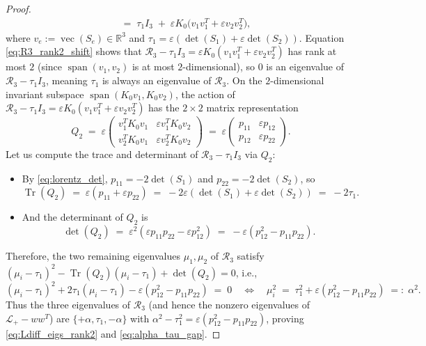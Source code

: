 \documentclass[11pt,a4paper]{article}
\theoremstyle{plain}
\theoremstyle{definition}
\theoremstyle{remark}
\DeclareMathOperator{\Tr}{Tr}
\DeclareMathOperator{\vecop}{vec}
\begin{document}
\begin{proof}
\begin{align}
  &\;=\; \tau_1 I_3 \;+\; \varepsilon K_0 \big(v_1 v_1^T + \varepsilon v_2 v_2^T\big), \label{eq:R3_rank2_shift}
\end{align}
where $v_e := \vecop(S_e) \in \mathbb{R}^3$ and $\tau_1 = \varepsilon(\det(S_1) + \varepsilon \det(S_2))$. Equation \eqref{eq:R3_rank2_shift} shows that $\mathcal{R}_3 - \tau_1 I_3 = \varepsilon K_0(v_1 v_1^T + \varepsilon v_2 v_2^T)$ has rank at most $2$ (since $\operatorname{span}(v_1, v_2)$ is at most $2$-dimensional), so $0$ is an eigenvalue of $\mathcal{R}_3 - \tau_1 I_3$, meaning $\tau_1$ is always an eigenvalue of $\mathcal{R}_3$. On the $2$-dimensional invariant subspace $\operatorname{span}(K_0 v_1, K_0 v_2)$, the action of $\mathcal{R}_3 - \tau_1 I_3 = \varepsilon K_0(v_1 v_1^T + \varepsilon v_2 v_2^T)$ has the $2 \times 2$ matrix representation
\[
  Q_2 \;=\; \varepsilon \begin{pmatrix} v_1^T K_0 v_1 & \varepsilon v_1^T K_0 v_2 \\ v_2^T K_0 v_1 & \varepsilon v_2^T K_0 v_2 \end{pmatrix} \;=\; \varepsilon \begin{pmatrix} p_{11} & \varepsilon p_{12} \\ p_{12} & \varepsilon p_{22} \end{pmatrix}.
\]
Let us compute the trace and determinant of $\mathcal{R}_3 - \tau_1 I_3$ via $Q_2$:
\begin{itemize}[nosep]
  \item By \eqref{eq:lorentz_det}, $p_{11} = -2\det(S_1)$ and $p_{22} = -2\det(S_2)$, so
  \[
    \Tr(Q_2) \;=\; \varepsilon(p_{11} + \varepsilon p_{22}) \;=\; -2\varepsilon(\det(S_1) + \varepsilon \det(S_2)) \;=\; -2\tau_1.
  \]
  \item And the determinant of $Q_2$ is
  \[
    \det(Q_2) \;=\; \varepsilon^2(\varepsilon p_{11}p_{22} - \varepsilon p_{12}^2) \;=\; -\varepsilon(p_{12}^2 - p_{11}p_{22}).
  \]
\end{itemize}
Therefore, the two remaining eigenvalues $\mu_1, \mu_2$ of $\mathcal{R}_3$ satisfy $(\mu_i - \tau_1)^2 - \Tr(Q_2)(\mu_i - \tau_1) + \det(Q_2) = 0$, i.e.,
\[
  (\mu_i - \tau_1)^2 + 2\tau_1(\mu_i - \tau_1) - \varepsilon(p_{12}^2 - p_{11}p_{22}) \;=\; 0 \quad \Longleftrightarrow \quad \mu_i^2 \;=\; \tau_1^2 + \varepsilon(p_{12}^2 - p_{11}p_{22}) \;=:\; \alpha^2.
\]
Thus the three eigenvalues of $\mathcal{R}_3$ (and hence the nonzero eigenvalues of $\mathcal{L}_+ - w w^T$) are $\{+\alpha, \tau_1, -\alpha\}$ with $\alpha^2 - \tau_1^2 = \varepsilon(p_{12}^2 - p_{11}p_{22})$, proving \eqref{eq:Ldiff_eigs_rank2} and \eqref{eq:alpha_tau_gap}.


\end{proof}
\end{document}
